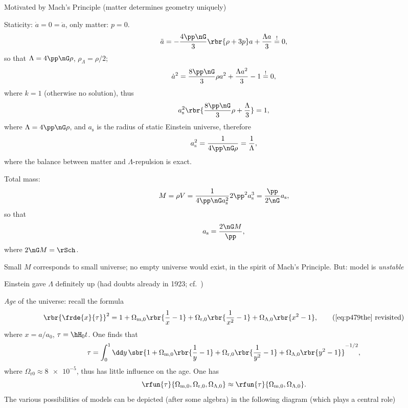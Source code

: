 Motivated by Mach's Principle (matter determines geometry uniquely)

Staticity: $\dot{a} = 0 = \ddot{a}$, only matter: $p = 0$.
\begin{equation}
\ddot{a} = -\frac{4\pp\nG}{3}\rbr{\rho + 3p} a + \frac{\Lambda a}{3} 
\overset{!}{=} 0,
\end{equation}
so that $\Lambda = 4\pp\nG\rho$, $\rho_\Lambda = \rho/2$;
\begin{equation}
\dot{a}^2 = \frac{8\pp\nG}{3}\rho a^2 + \frac{\Lambda a^2}{3} - 1 
\overset{!}{=} 0,
\end{equation}
where $k = 1$ (otherwise no solution), thus
\begin{equation}
a_\text{s}^2\rbr{\frac{8\pp\nG}{3}\rho + \frac{\Lambda}{3}} = 1,
\end{equation}
where $\Lambda = 4\pp\nG\rho$, and $a_\text{s}$ is the radius of static 
Einstein universe, therefore
\begin{equation}
a_\text{s}^2 = \frac{1}{4\pp\nG\rho} = \frac{1}{\Lambda},
\end{equation}
where the balance between matter and $\Lambda$-repulsion is exact.

Total mass:
\begin{equation}
M = \rho V = \frac{1}{4\pp\nG a_\text{s}^2}2\pp^2 a_\text{s}^3 = 
\frac{\pp}{2\nG} a_\text{s},
\end{equation}
so that
\begin{equation}
a_\text{s} = \frac{2\nG M}{\pp},
\end{equation}
where $2\nG M = \rSch$.

Small $M$ corresponds to small universe; no empty universe would exist, in the 
spirit of Mach's Principle. But: model is \emph{unstable} \cite{Eddington1930}

Einstein gave $\Lambda$ definitely up (had doubts already in 1923; cf.\ 
\cite{nussbaumer2014})

\emph{Age} of the universe: recall the formula
\begin{equation}
\rbr{\frde{x}{\tau}}^2 = 1 + \Omega_{\text{m},0}\rbr{\frac{1}{x}-1} + 
\Omega_{\text{r},0}\rbr{\frac{1}{x^2}-1} + \Omega_{\Lambda,0} \rbr{x^2-1},
\tag{\ref{eq:p479the} revisited}
\end{equation}
where $x = a/a_0$, $\tau = \hH_0 t$. One finds that
\begin{equation}
\tau = \int_0^1\dd y\,\sbr{1 + \Omega_{\text{m},0}\rbr{\frac{1}{y}-1}+
\Omega_{\text{r},0}\rbr{\frac{1}{y^2}-1}+\Omega_{\Lambda,0}\rbr{y^2-1}}^{-1/2},
\end{equation}
where $\Omega_{\text{r}{0}} \approx \num{8e-5}$, thus has little influence on 
the age. One has
\begin{equation}
\rfun{\tau}{\Omega_{\text{m},0},\Omega_{\text{r},0},\Omega_{\Lambda,0}}\approx
\rfun{\tau}{\Omega_{\text{m},0},\Omega_{\Lambda,0}}.
\end{equation}
The various possibilities of models can be depicted (after some algebra) in the 
following diagram (which plays a central role)

